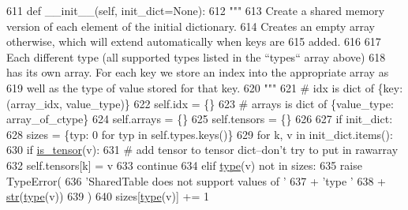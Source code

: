 \begin{DoxyCode}
611     \textcolor{keyword}{def }\_\_init\_\_(self, init\_dict=None):
612         \textcolor{stringliteral}{"""}
613 \textcolor{stringliteral}{        Create a shared memory version of each element of the initial dictionary.}
614 \textcolor{stringliteral}{        Creates an empty array otherwise, which will extend automatically when keys are}
615 \textcolor{stringliteral}{        added.}
616 \textcolor{stringliteral}{}
617 \textcolor{stringliteral}{        Each different type (all supported types listed in the ``types`` array above)}
618 \textcolor{stringliteral}{        has its own array. For each key we store an index into the appropriate array as}
619 \textcolor{stringliteral}{        well as the type of value stored for that key.}
620 \textcolor{stringliteral}{        """}
621         \textcolor{comment}{# idx is dict of \{key: (array\_idx, value\_type)\}}
622         self.idx = \{\}
623         \textcolor{comment}{# arrays is dict of \{value\_type: array\_of\_ctype\}}
624         self.arrays = \{\}
625         self.tensors = \{\}
626 
627         \textcolor{keywordflow}{if} init\_dict:
628             sizes = \{typ: 0 \textcolor{keywordflow}{for} typ \textcolor{keywordflow}{in} self.types.keys()\}
629             \textcolor{keywordflow}{for} k, v \textcolor{keywordflow}{in} init\_dict.items():
630                 \textcolor{keywordflow}{if} \hyperlink{namespaceparlai_1_1agents_1_1legacy__agents_1_1seq2seq_1_1utils__v0_a96c8bd68b645f94b1257c37f8c5646f5}{is\_tensor}(v):
631                     \textcolor{comment}{# add tensor to tensor dict--don't try to put in rawarray}
632                     self.tensors[k] = v
633                     \textcolor{keywordflow}{continue}
634                 \textcolor{keywordflow}{elif} \hyperlink{namespaceparlai_1_1agents_1_1tfidf__retriever_1_1build__tfidf_ad5dfae268e23f506da084a9efb72f619}{type}(v) \textcolor{keywordflow}{not} \textcolor{keywordflow}{in} sizes:
635                     \textcolor{keywordflow}{raise} TypeError(
636                         \textcolor{stringliteral}{'SharedTable does not support values of '}
637                         + \textcolor{stringliteral}{'type '}
638                         + \hyperlink{namespacegenerate__task__READMEs_a5b88452ffb87b78c8c85ececebafc09f}{str}(\hyperlink{namespaceparlai_1_1agents_1_1tfidf__retriever_1_1build__tfidf_ad5dfae268e23f506da084a9efb72f619}{type}(v))
639                     )
640                 sizes[\hyperlink{namespaceparlai_1_1agents_1_1tfidf__retriever_1_1build__tfidf_ad5dfae268e23f506da084a9efb72f619}{type}(v)] += 1

\end{DoxyCode}
